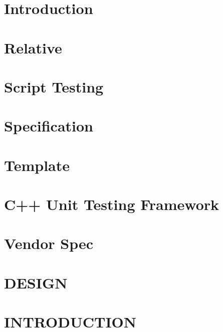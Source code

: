 \documentclass[twoside]{book}
\newcommand{\+}{\discretionary{\mbox{\scriptsize$\hookleftarrow$}}{}{}}
\begin{document}
\chapter{Introduction}
\label{doc_decisions_README_md}
\hypertarget{doc_decisions_README_md}{}

\chapter{Relative}
\label{doc_decisions_relative_md}
\hypertarget{doc_decisions_relative_md}{}

\chapter{Script Testing}
\label{doc_decisions_script_testing_md}
\hypertarget{doc_decisions_script_testing_md}{}

\chapter{Specification}
\label{doc_decisions_specification_md}
\hypertarget{doc_decisions_specification_md}{}

\chapter{Template}
\label{doc_decisions_template_md}
\hypertarget{doc_decisions_template_md}{}

\chapter{C++ Unit Testing Framework}
\label{doc_decisions_unit_testing_md}
\hypertarget{doc_decisions_unit_testing_md}{}

\chapter{Vendor Spec}
\label{doc_decisions_vendor_spec_md}
\hypertarget{doc_decisions_vendor_spec_md}{}

\chapter{D\+E\+S\+I\+G\+N}
\label{doc_DESIGN_md}
\hypertarget{doc_DESIGN_md}{}

\chapter{I\+N\+T\+R\+O\+D\+U\+C\+T\+I\+O\+N}
\label{doc_GIT_md}
\hypertarget{doc_GIT_md}{}

\end{document}
